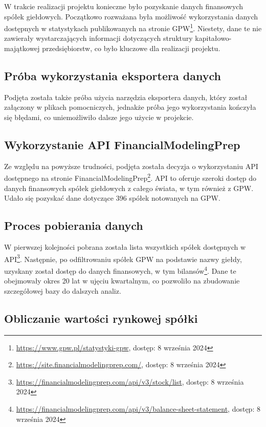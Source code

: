 \documentclass[12pt]{article}
\begin{document}
W trakcie realizacji projektu konieczne było pozyskanie danych finansowych spółek giełdowych. Początkowo rozważana była możliwość wykorzystania danych dostępnych w statystykach publikowanych na stronie GPW\footnote{\url{https://www.gpw.pl/statystyki-gpw}, dostęp: 8 września 2024}. Niestety, dane te nie zawierały wystarczających informacji dotyczących struktury kapitałowo-majątkowej przedsiębiorstw, co było kluczowe dla realizacji projektu.

\subsection{Próba wykorzystania eksportera danych}

Podjęta została także próba użycia narzędzia eksportera danych, który został załączony w plikach pomocniczych, jednakże próba jego wykorzystania kończyła się błędami, co uniemożliwiło dalsze jego użycie w projekcie.

\subsection{Wykorzystanie API FinancialModelingPrep}

Ze względu na powyższe trudności, podjęta została decyzja o wykorzystaniu API dostępnego na stronie FinancialModelingPrep\footnote{\url{https://site.financialmodelingprep.com/}, dostęp: 8 września 2024}. API to oferuje szeroki dostęp do danych finansowych spółek giełdowych z całego świata, w tym również z GPW. Udało się pozyskać dane dotyczące 396 spółek notowanych na GPW.

\subsection{Proces pobierania danych}

W pierwszej kolejności pobrana została lista wszystkich spółek dostępnych w API\footnote{\url{https://financialmodelingprep.com/api/v3/stock/list}, dostęp: 8 września 2024}. Następnie, po odfiltrowaniu spółek GPW na podstawie nazwy giełdy, uzyskany został dostęp do danych finansowych, w tym bilansów\footnote{\url{https://financialmodelingprep.com/api/v3/balance-sheet-statement}, dostęp: 8 września 2024}. Dane te obejmowały okres 20 lat w ujęciu kwartalnym, co pozwoliło na zbudowanie szczegółowej bazy do dalszych analiz.

\subsection{Obliczanie wartości rynkowej spółki}
\end{document}
